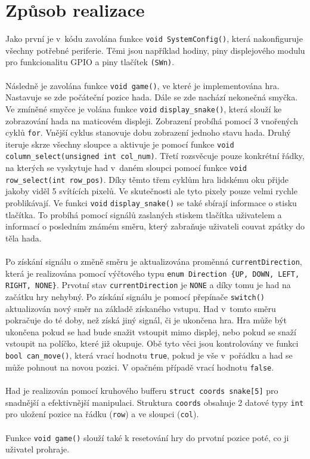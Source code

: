 \documentclass[]{fitiel} %
\begin{document}
    \section{Způsob realizace}
    Jako první je v~kódu zavolána funkce \verb|void SystemConfig()|, která nakonfiguruje všechny potřebné periferie. Těmi jsou například hodiny, piny displejového modulu pro funkcionalitu GPIO a piny tlačítek \verb|(SWn)|.
    \\\\
    Následně je zavolána funkce \verb|void game()|, ve které je implementována hra. Nastavuje se zde počáteční pozice hada. Dále se zde nachází nekonečná smyčka. Ve zmíněné smyčce je volána funkce \verb|void| \verb|display_snake()|, která slouží ke zobrazování hada na maticovém displeji. Zobrazení probíhá pomocí 3 vnořených cyklů \verb|for|. Vnější cyklus stanovuje dobu zobrazení jednoho stavu hada. Druhý iteruje skrze všechny sloupce a aktivuje je pomocí funkce \verb|void column_select(unsigned int col_num)|. Třetí rozsvěcuje pouze konkrétní řádky, na kterých se vyskytuje had v~daném sloupci pomocí funkce \verb|void row_select(int row_pos)|. Díky těmto třem cyklům hra lidskému oku přijde jakoby viděl 5 svítících pixelů. Ve skutečnosti ale tyto pixely pouze velmi rychle problikávají. Ve funkci \verb|void|  \verb|display_snake()| se také sbírají informace o stisku tlačítka. To probíhá pomocí signálů zaslaných stiskem tlačítka uživatelem a informací o posledním známém směru, který zabraňuje uživateli couvat zpátky do těla hada.
    \\\\
    Po získání signálu o změně směru je aktualizována proměnná \verb|currentDirection|, která je realizována pomocí výčtového typu \verb|enum Direction {UP, DOWN, LEFT, RIGHT, NONE}|. Prvotní stav \verb|currentDirection| je \verb|NONE| a díky tomu je had na začátku hry nehybný. Po získání signálu je pomocí přepínače \verb|switch()| aktualizován nový směr na základě získaného vstupu. Had v~tomto směru pokračuje do té doby, než získá jiný signál, či je ukončena hra. Hra může být ukončena pokud se had bude snažit vstoupit mimo displej, nebo pokud se snaží vstoupit na políčko, které již okupuje. Obě tyto věci jsou kontrolovány ve funkci \verb|bool can_move()|, která vrací hodnotu \verb|true|, pokud je vše v~pořádku a had se může pohnout na novou pozici. V opačném případě vrací hodnotu \verb|false|.
    \\\\
    Had je realizován pomocí kruhového bufferu \verb|struct coords snake[5]| pro snadnější a efektivnější manipulaci. Struktura \verb|coords| obsahuje 2 datové typy \verb|int| pro uložení pozice na řádku (\verb|row|) a ve sloupci (\verb|col|).
    \\\\
    Funkce \verb|void game()| slouží také k resetování hry do prvotní pozice poté, co ji uživatel prohraje.  
\end{document}
